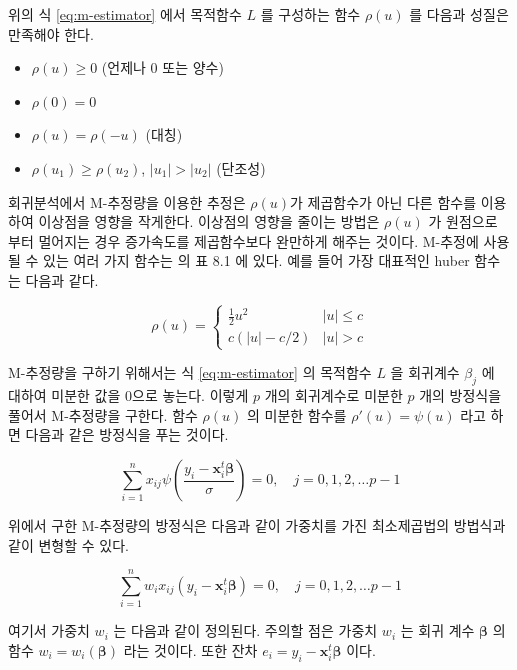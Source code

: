 \documentclass[
  10pt,
]{book}
\providecommand{\tightlist}{%
  \setlength{\itemsep}{0pt}\setlength{\parskip}{0pt}}
\theoremstyle{definition}
\theoremstyle{definition}
\theoremstyle{definition}
\theoremstyle{definition}
\theoremstyle{remark}
\begin{document}
위의 식 \eqref{eq:m-estimator} 에서 목적함수 \(L\) 를 구성하는 함수 \(\rho(u)\) 를 다음과 성질은 만족해야 한다.

\begin{itemize}
\tightlist
\item
  \(\rho(u) \ge 0\) (언제나 0 또는 양수)
\item
  \(\rho(0)=0\)
\item
  \(\rho(u) = \rho(-u)\) (대칭)
\item
  \(\rho(u_1) \ge \rho(u_2)\), \(|u_1| > |u_2|\) (단조성)
\end{itemize}

회귀분석에서 M-추정량을 이용한 추정은 \(\rho(u)\)가 제곱함수가 아닌 다른 함수를 이용하여 이상점을 영향을 작게한다. 이상점의 영향을 줄이는 방법은 \(\rho(u)\) 가 원점으로 부터 멀어지는 경우 증가속도를 제곱함수보다 완만하게 해주는 것이다.
M-추정에 사용될 수 있는 여러 가지 함수는 \citet{kang2016you} 의 표 8.1 에 있다. 예를 들어 가장 대표적인 huber 함수는 다음과 같다.

\begin{equation*} 
\rho(u) =
\begin{cases}
\frac{1}{2} u^2 & |u| \le c \\
c(|u| - c/2) & |u| > c 
\end{cases}
\end{equation*}

M-추정량을 구하기 위해서는 식 \eqref{eq:m-estimator} 의 목적함수 \(L\) 을 회귀계수 \(\beta_j\) 에 대하여 미분한 값을 0으로 놓는다. 이렇게 \(p\) 개의 회귀계수로 미분한 \(p\) 개의 방정식을 풀어서 M-추정량을 구한다. 함수 \(\rho(u)\) 의 미분한 함수를 \(\rho'(u) = \psi(u)\) 라고 하면 다음과 같은 방정식을 푸는 것이다.

\begin{equation}
\sum_{i=1}^n x_{ij} \psi \left ( \frac{ y_i - {\bm x}_i^t \bm \beta}{\sigma } \right ) =0 ,\quad j=0,1,2, \dots p-1 
\label{eq:m-equation}
\end{equation}

위에서 구한 M-추정량의 방정식은 다음과 같이 가중치를 가진 최소제곱법의 방법식과 같이 변형할 수 있다.

\begin{equation}
\sum_{i=1}^n  w_i x_{ij} ( y_i - {\bm x}_i^t \bm \beta) =0 ,\quad j=0,1,2, \dots p-1 
\label{eq:m-equation2}
\end{equation}

여기서 가중치 \(w_i\) 는 다음과 같이 정의된다. 주의할 점은 가중치 \(w_i\) 는 회귀 계수 \(\bm \beta\) 의 함수
\(w_i = w_i(\bm \beta)\) 라는 것이다. 또한 잔차 \(e_i = y_i - {\bm x}_i^t \bm \beta\) 이다.
\end{document}
